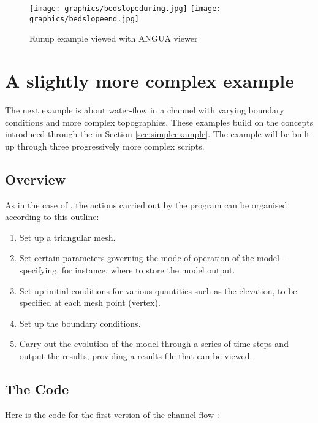 \documentclass{manual}
\begin{document}
\begin{figure}[htp]
  \centerline{
    \texttt{[image: graphics/bedslopeduring.jpg]}
    \texttt{[image: graphics/bedslopeend.jpg]}
   }
  \caption{Runup example viewed with ANGUA viewer}
  \label{fig:runup2}
\end{figure}

\clearpage


\chapter{A slightly more complex example}
\label{sec:channelexample}


The next example is about water-flow in a channel with varying boundary conditions and
more complex topographies. These examples build on the
concepts introduced through the  in Section \ref{sec:simpleexample}.
The example will be built up through three progressively more complex scripts.

\section{Overview}

As in the case of , the actions carried
out by the program can be organised according to this outline:
\begin{enumerate}
   \item Set up a triangular mesh.
   \item Set certain parameters governing the mode of
         operation of the model -- specifying, for instance, where to store the
         model output.
   \item Set up initial conditions for various quantities such as the elevation, to be specified at each mesh point (vertex).
   \item Set up the boundary conditions.
   \item Carry out the evolution of the model through a series of time
         steps and output the results, providing a results file that can be
         viewed.
\end{enumerate}

\section{The Code}

Here is the code for the first version of the channel flow :
\end{document}
